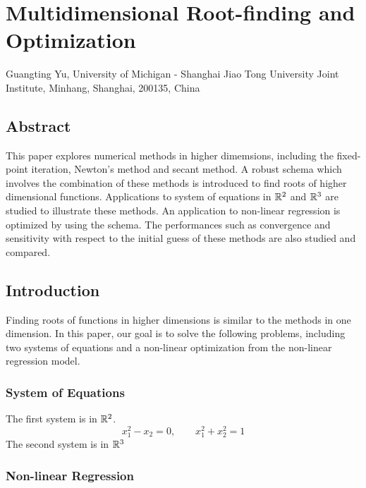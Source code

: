 \chapter{Multidimensional Root-finding and Optimization}
\begin{center}
Guangting Yu, University of Michigan - Shanghai Jiao Tong University Joint Institute, Minhang, Shanghai, 200135, China
\end{center}


\section*{Abstract}
This paper explores numerical methods in higher dimemsions, including the fixed-point iteration, Newton's method and secant method.
A robust schema which involves the combination of these methods is introduced to find roots of higher dimensional functions.
Applications to system of equations in \(\mathbb{R}^2\) and \(\mathbb{R}^3\) are studied to illustrate these methods.
An application to non-linear regression is optimized by using the schema.
The performances such as convergence and sensitivity with respect to the initial guess of these methods are also studied and compared.






\section{Introduction}
Finding roots of functions in higher dimensions is similar to the methods in one dimension.
In this paper, our goal is to solve the following problems, including two systems of equations and a non-linear optimization from the non-linear regression model.


\subsection{System of Equations}
The first system is in \(\mathbb{R}^2\).
\begin{equation}\label{eqn1}
x_1^2-x_2=0, \qquad x_1^2+x_2^2=1
\end{equation}
The second system is in \(\mathbb{R}^3\)

\subsection{Non-linear Regression}


\cite{sherman}




